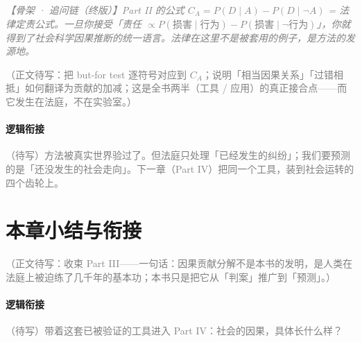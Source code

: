 \documentclass[../../main2.tex]{subfiles}
\begin{document}
	\textcolor{gray}{\textit{【骨架 · 追问链（终版）】Part II 的公式 $C_A = P(D\mid A)-P(D\mid\neg A)$ = 法律定责公式。一旦你接受「责任 $\propto P(\text{损害}\mid\text{行为})-P(\text{损害}\mid\neg\text{行为})$」，你就得到了社会科学因果推断的统一语言。法律在这里不是被套用的例子，是方法的发源地。}}

	\textcolor{gray}{（正文待写：把 but-for test 逐符号对应到 $C_A$；说明「相当因果关系」「过错相抵」如何翻译为贡献的加减；这是全书两半（工具 / 应用）的真正接合点——而它发生在法庭，不在实验室。）}

	\paragraph*{逻辑衔接}
	\textcolor{gray}{（待写）方法被真实世界验过了。但法庭只处理「已经发生的纠纷」；我们要预测的是「还没发生的社会走向」。下一章（Part IV）把同一个工具，装到社会运转的四个齿轮上。}

	\section{本章小结与衔接}
	\label{sec:court-summary}

	\textcolor{gray}{（正文待写：收束 Part III——一句话：因果贡献分解不是本书的发明，是人类在法庭上被迫练了几千年的基本功；本书只是把它从「判案」推广到「预测」。）}

	\paragraph*{逻辑衔接}
	\textcolor{gray}{（待写）带着这套已被验证的工具进入 Part IV：社会的因果，具体长什么样？}
\end{document}
